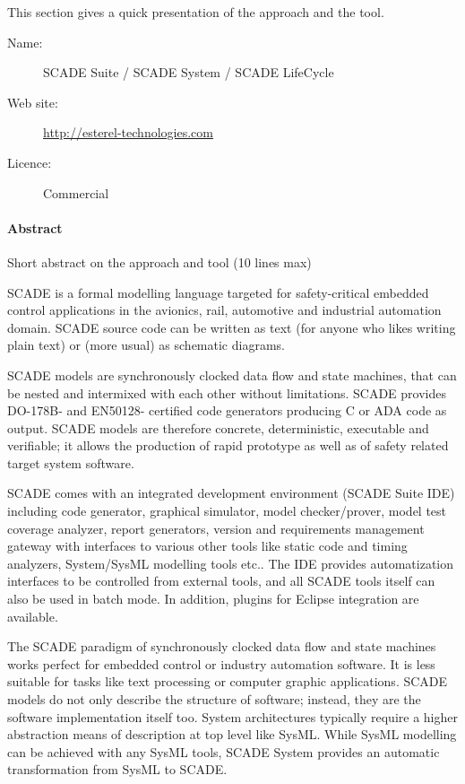 This section gives a quick presentation of the approach and the tool.

\begin{description}
\item[Name:] SCADE Suite / SCADE System / SCADE LifeCycle
\item[Web site: ] \url{http://esterel-technologies.com }
\item[Licence: ] Commercial
\end{description}

\paragraph{Abstract} Short abstract on the approach and tool (10 lines max)

SCADE is a formal modelling language targeted for safety-critical embedded control applications
in the avionics, rail, automotive and industrial automation domain. SCADE source code can be
written as text (for anyone who likes writing plain text) or (more usual) as schematic diagrams.

SCADE models are synchronously clocked data flow and state machines, that can be nested
and intermixed with each other without limitations. SCADE provides DO-178B- and EN50128-
certified code generators producing C or ADA code as output. SCADE models are therefore concrete, deterministic, executable and verifiable; it allows the production of rapid prototype as
well as of safety related target system software.

SCADE comes with an integrated development environment (SCADE Suite IDE) including
code generator, graphical simulator, model checker/prover, model test coverage analyzer, report
generators, version and requirements management gateway with interfaces to various other tools
like static code and timing analyzers, System/SysML modelling tools etc.. The IDE provides
automatization interfaces to be controlled from external tools, and all SCADE tools itself can
also be used in batch mode. In addition, plugins for Eclipse integration are available.

The SCADE paradigm of synchronously clocked data flow and state machines works perfect for
embedded control or industry automation software. It is less suitable for tasks like text processing
or computer graphic applications. SCADE models do not only describe the structure of software;
instead, they are the software implementation itself too. System architectures typically require a
higher abstraction means of description at top level like SysML. While SysML modelling can
be achieved with any SysML tools, SCADE System provides an automatic transformation from
SysML to SCADE.

